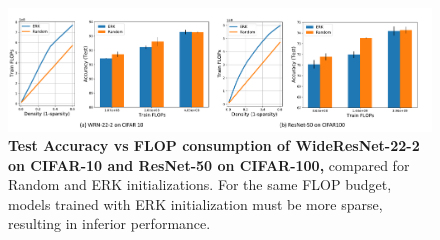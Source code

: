 \begin{figure}[h]
    \centering
    \includegraphics[width=1\textwidth]{../openreview/figs/erk_vs_random_FLOPs.pdf}
    \captionsetup{aboveskip=\figureaboveskip,belowskip=\figurebelowskip}
    \caption{\textbf{Test Accuracy vs FLOP consumption of WideResNet-22-2 on CIFAR-10 and ResNet-50 on CIFAR-100,} compared for Random and ERK initializations. For the same FLOP budget, models trained with ERK initialization must be more sparse, resulting in inferior performance.}
    \label{fig:erk-vs-random-FLOPs}
\end{figure}